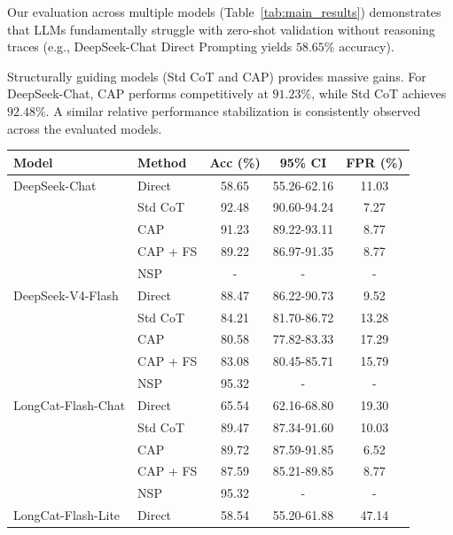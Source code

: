 \documentclass{article}
\theoremstyle{plain}
\theoremstyle{definition}
\theoremstyle{remark}
\begin{document}
Our evaluation across multiple models (Table~\ref{tab:main_results}) demonstrates that LLMs fundamentally struggle with zero-shot validation without reasoning traces (e.g., DeepSeek-Chat Direct Prompting yields $58.65\%$ accuracy). 

Structurally guiding models (Std CoT and CAP) provides massive gains. For DeepSeek-Chat, CAP performs competitively at $91.23\%$, while Std CoT achieves $92.48\%$. A similar relative performance stabilization is consistently observed across the evaluated models.

\begin{table}[t] %
  \centering
  
  \begin{minipage}[t]{0.45\textwidth}
    \centering
    \begin{footnotesize}
    \setlength{\tabcolsep}{3pt}
      \begin{tabular}{llccc}
        \toprule
        Model & Method & Acc (\%) & 95\% CI & FPR (\%) \\
        \midrule
        DeepSeek-Chat & Direct & 58.65 & 55.26-62.16 & 11.03 \\
         & Std CoT & 92.48 & 90.60-94.24 & 7.27 \\
         & CAP & 91.23 & 89.22-93.11 & 8.77 \\
         & CAP + FS & 89.22 & 86.97-91.35 & 8.77 \\
         & NSP & - & - & - \\
        \midrule
        DeepSeek-V4-Flash & Direct & 88.47 & 86.22-90.73 & 9.52 \\
         & Std CoT & 84.21 & 81.70-86.72 & 13.28 \\
         & CAP & 80.58 & 77.82-83.33 & 17.29 \\
         & CAP + FS & 83.08 & 80.45-85.71 & 15.79 \\
         & NSP & 95.32 & - & - \\
        \midrule
        LongCat-Flash-Chat & Direct & 65.54 & 62.16-68.80 & 19.30 \\
         & Std CoT & 89.47 & 87.34-91.60 & 10.03 \\
         & CAP & 89.72 & 87.59-91.85 & 6.52 \\
         & CAP + FS & 87.59 & 85.21-89.85 & 8.77 \\
         & NSP & 95.32 & - & - \\
        \midrule
        LongCat-Flash-Lite & Direct & 58.54 & 55.20-61.88 & 47.14 \\

\end{tabular}
\end{footnotesize}
\end{minipage}
\end{table}
\end{document}
